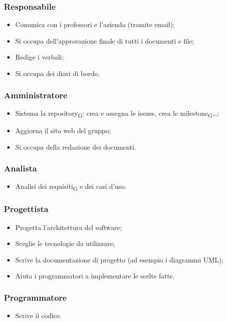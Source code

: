 \documentclass[11pt,a4paper]{article}
\newcommand{\gls}[1]{#1\textsubscript{G}}
\begin{document}
\subsubsection{Responsabile}
\begin{itemize}
    \item Comunica con i professori e l'azienda (tramite email);
    \item Si occupa dell'approvazione finale di tutti i documenti e file;
    \item Redige i verbali;
    \item Si occupa dei diari di bordo.
\end{itemize}

\subsubsection{Amministratore}
\begin{itemize}
    \item Sistema la \gls{repository}: crea e assegna le issues, crea le \gls{milestone}…;
    \item Aggiorna il sito web del gruppo;
    \item Si occupa della redazione dei documenti.
\end{itemize}

\subsubsection{Analista}
\begin{itemize}
    \item \gls{Analisi dei requisiti} e dei casi d'uso.
\end{itemize}

\subsubsection{Progettista}
\begin{itemize}
    \item Progetta l’architettura del software;
    \item Sceglie le tecnologie da utilizzare;
    \item Scrive la documentazione di progetto (ad esempio i diagrammi UML);
    \item Aiuta i programmatori a implementare le scelte fatte.
\end{itemize}

\subsubsection{Programmatore}
\begin{itemize}
    \item Scrive il codice.
\end{itemize}
\end{document}
